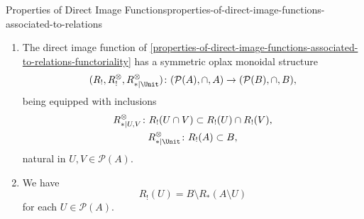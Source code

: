 \begin{proposition}{Properties of Direct Image Functions}{properties-of-direct-image-functions-associated-to-relations}
\begin{enumerate}
\[\begin{gathered}
                    R^{\otimes}_{*|U,V}   \colon R_{!}(U)\cup R_{!}(V) \rightequalsarrow R_{!}(U\cup V),\\
                    R^{\otimes}_{*|\Unit} \colon \emptyset             \rightequalsarrow \emptyset,
                \end{gathered}
            \]%
            natural in $U,V\in\mathcal{P}(A)$.
        \item\label{properties-of-direct-image-functions-associated-to-relations-symmetric-oplax-monoidality-with-respect-to-intersections}The direct image function of \cref{properties-of-direct-image-functions-associated-to-relations-functoriality} has a symmetric oplax monoidal structure
            \[
                (R_{!},R^{\otimes}_{!},R^{\otimes}_{*|\Unit})
                \colon
                (\mathcal{P}(A),\cap,A)
                \to
                (\mathcal{P}(B),\cap,B),
            \]%
            being equipped with inclusions%
            \[
                \begin{gathered}
                    R^{\otimes}_{*|U,V}   \colon R_{!}(U\cap V) \subset R_{!}(U)\cap R_{!}(V),\\
                    R^{\otimes}_{*|\Unit} \colon R_{!}(A)       \subset B,
                \end{gathered}
            \]%
            natural in $U,V\in\mathcal{P}(A)$.
        \item\label{properties-of-direct-image-functions-associated-to-relations-relation-to-codirect-images}We have
            \[
                R_{!}(U)%
                =%
                B\setminus R_{*}(A\setminus U)%
            \]%
            for each $U\in\mathcal{P}(A)$.
    \end{enumerate}
\end{proposition}

